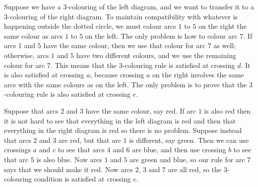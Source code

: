 \documentclass[a4paper]{amsart}
\begin{document}
\begin{solution}
\begin{enumerate}
\begin{enumerate}
     Suppose we have a $3$-colouring of the left diagram, and we want
     to transfer it to a $3$-colouring of the right diagram.  To
     maintain compatibility with whatever is happening outside the
     dotted circle, we must colour arcs $1$ to $5$ on the right the
     same colour as arcs $1$ to $5$ on the left.  The only problem is
     how to colour arc $7$.  If arcs $1$ and $5$ have the same colour,
     then we use that colour for arc $7$ as well; otherwise, arcs $1$
     and $5$ have two different colours, and we use the remaining
     colour for arc $7$.  This means that the $3$-colouring rule is
     satisfied at crossing $d$.  It is also satisfied at crossing $a$,
     because crossing $a$ on the right involves the same arcs with the
     same colours as on the left.  The only problem is to prove that
     the $3$-colouring rule is also satisfied at crossing $e$.  

    Suppose that arcs $2$ and $3$ have the same colour, say red.  If
    arc $1$ is also red then it is not hard to see that everything in
    the left diagram is red and then that everything in the right
    diagram is red so there is no problem.  Suppose instead that arcs
    $2$ and $3$ are red, but that arc $1$ is different, say green.
    Then we can use crossings $a$ and $c$ to see that arcs $4$ and $6$
    are blue, and then use crossing $b$ to see that arc $5$ is also
    blue.  Now arcs $1$ and $5$ are green and blue, so our rule for
    arc $7$ says that we should make it red.  Now arcs $2$, $3$ and
    $7$ are all red, so the $3$-colouring condition is satisfied at
    crossing $e$.


\end{enumerate}
\end{enumerate}
\end{solution}
\end{document}
